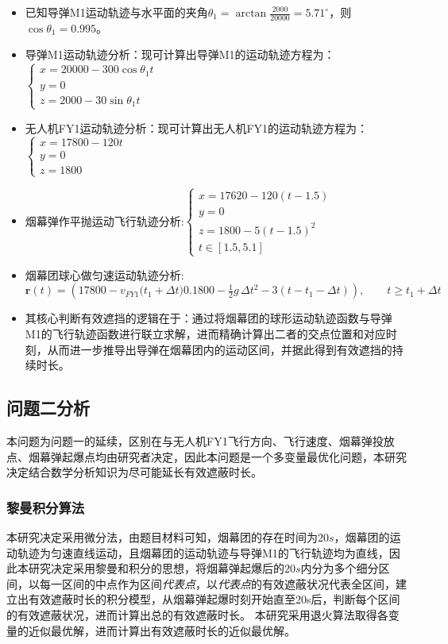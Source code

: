 \documentclass{article}
\begin{document}
\begin{itemize}
    \item 已知导弹M1运动轨迹与水平面的夹角$\theta_1 = \arctan{\frac{2000}{20000}} = 5.71^\circ$，则$\cos\theta_1 = 0.995$。
    \item 导弹M1运动轨迹分析：现可计算出导弹M1的运动轨迹方程为：$\begin{cases}
        x = 20000 - 300 \cos\theta_1 t \\
        y = 0 \\
        z = 2000 - 30 \sin \theta_1t
    \end{cases}$
    \item 无人机FY1运动轨迹分析：现可计算出无人机FY1的运动轨迹方程为：$\begin{cases}
        x = 17800 - 120t \\
        y = 0 \\
        z = 1800 
    \end{cases}$
    \item 烟幕弹作平抛运动飞行轨迹分析:$\begin{cases}
        x = 17620 - 120(t - 1.5) \\
        y = 0 \\
        z = 1800  - 5(t - 1.5)^2 \\
        t \in [1.5,5.1]
    \end{cases}$
    \item 烟幕团球心做匀速运动轨迹分析:\[
\mathbf{r}(t)=\left(
17800 - v_{FY1}\big(t_1+ \Delta t)
0.1800 - \tfrac{1}{2}g\,\Delta t^{2} - 3(t - t_1 - \Delta t)
\right),
\qquad t \ge t_1 + \Delta t
\]
    \item 其核心判断有效遮挡的逻辑在于：通过将烟幕团的球形运动轨迹函数与导弹M1的飞行轨迹函数进行联立求解，进而精确计算出二者的交点位置和对应时刻，从而进一步推导出导弹在烟幕团内的运动区间，并据此得到有效遮挡的持续时长。
\end{itemize}

\subsection{问题二分析}
本问题为问题一的延续，区别在与无人机FY1飞行方向、飞行速度、烟幕弹投放点、烟幕弹起爆点均由研究者决定，因此本问题是一个多变量最优化问题，本研究决定结合数学分析知识为尽可能延长有效遮蔽时长。
\subsubsection{黎曼积分算法}
本研究决定采用微分法，由题目材料可知，烟幕团的存在时间为20$s$，烟幕团的运动轨迹为匀速直线运动，且烟幕团的运动轨迹与导弹M1的飞行轨迹均为直线，因此本研究决定采用黎曼和积分的思想，将烟幕弹起爆后的$20s$内分为多个细分区间，以每一区间的中点作为区间\textit{代表点}，以\textit{代表点}的有效遮蔽状况代表全区间，建立出有效遮蔽时长的积分模型，从烟幕弹起爆时刻开始直至20s后，判断每个区间的有效遮蔽状况，进而计算出总的有效遮蔽时长。
本研究采用退火算法取得各变量的近似最优解，进而计算出有效遮蔽时长的近似最优解。
\end{document}
